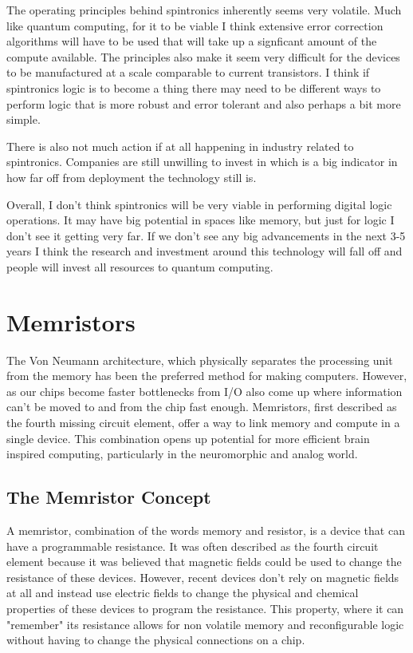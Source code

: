 \documentclass[sigconf]{acmart}
\begin{document}
The operating principles behind spintronics inherently seems very
volatile. Much like quantum computing, for it to be viable I think 
extensive error correction algorithms will have to be used that will 
take up a signficant amount of the compute available. The principles 
also make it seem very difficult for the devices to be manufactured at 
a scale comparable to current transistors. I think if spintronics 
logic is to become a thing there may need to be different ways to 
perform logic that is more robust and error tolerant and also perhaps 
a bit more simple. 

There is also not much action if at all happening in industry 
related to spintronics. Companies are still unwilling to invest 
in which is a big indicator in how far off from deployment the 
technology still is. 

Overall, I don't think spintronics will be very viable in performing 
digital logic operations. It may have big potential in spaces like 
memory, but just for logic I don't see it getting very far. If we don't 
see any big advancements in the next 3-5 years I think the research 
and investment around this technology will fall off and people 
will invest all resources to quantum computing. 

\section{Memristors}
The Von Neumann architecture, which physically separates the processing 
unit from the memory has been the preferred method for making computers. 
However, as our chips become faster bottlenecks from I/O also come up 
where information can't be moved to and from the chip fast enough. Memristors, 
first described as the fourth missing circuit element, offer a way 
to link memory and compute in a single device. This combination opens up
potential for more efficient brain inspired computing, particularly 
in the neuromorphic and analog world. 

\subsection{The Memristor Concept}
A memristor, combination of the words memory and resistor, is a device 
that can have a programmable resistance. It was often described as 
the fourth circuit element because it was believed that magnetic fields 
could be used to change the resistance of these devices. However, recent 
devices don't rely on magnetic fields at all and instead use electric fields 
to change the physical and chemical properties of these devices to program 
the resistance. This property, where it can "remember" its resistance allows 
for non volatile memory and reconfigurable logic without having to change 
the physical connections on a chip.
\end{document}
